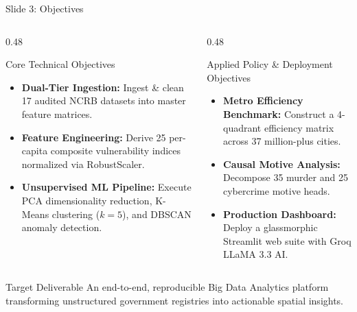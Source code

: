 \documentclass[aspectratio=169,10pt]{beamer}
\begin{document}
\begin{frame}{Slide 3: Objectives}
    \begin{columns}[T]
        \begin{column}{0.48\textwidth}
            \begin{block}{Core Technical Objectives}
                \begin{itemize}
                    \item \textbf{Dual-Tier Ingestion:} Ingest \& clean 17 audited NCRB datasets into master feature matrices.
                    \item \textbf{Feature Engineering:} Derive 25 per-capita composite vulnerability indices normalized via RobustScaler.
                    \item \textbf{Unsupervised ML Pipeline:} Execute PCA dimensionality reduction, K-Means clustering ($k=5$), and DBSCAN anomaly detection.
                \end{itemize}
            \end{block}
        \end{column}
        \begin{column}{0.48\textwidth}
            \begin{block}{Applied Policy \& Deployment Objectives}
                \begin{itemize}
                    \item \textbf{Metro Efficiency Benchmark:} Construct a 4-quadrant efficiency matrix across 37 million-plus cities.
                    \item \textbf{Causal Motive Analysis:} Decompose 35 murder and 25 cybercrime motive heads.
                    \item \textbf{Production Dashboard:} Deploy a glassmorphic Streamlit web suite with Groq LLaMA 3.3 AI.
                \end{itemize}
            \end{block}
        \end{column}
    \end{columns}

    \vspace{0.2cm}
    \begin{block}{Target Deliverable}
        An end-to-end, reproducible Big Data Analytics platform transforming unstructured government registries into actionable spatial insights.
    \end{block}
\end{frame}
\end{document}
